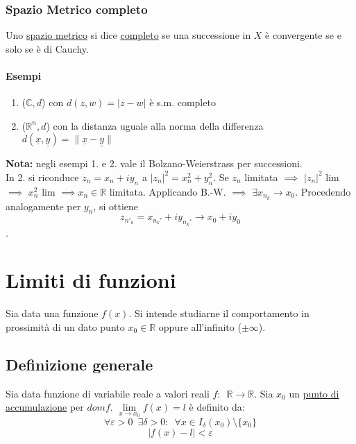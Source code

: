 \documentclass[10pt, oneside]{book}
\theoremstyle{plain}
\begin{document}
\subsection{Spazio Metrico completo}
\begin{defin}
Uno \hyperlink{metrico}{spazio metrico} si dice \underline{completo} se una successione in $X$ è convergente se e solo se è di Cauchy.
\end{defin}
\subsubsection{Esempi}
\begin{enumerate}
    \item ($\mathbb{C}, d$) con $d(z,w) = |z - w|$ è s.m. completo
    \item ($\mathbb{R}^n, d$) con la distanza uguale alla norma della differenza $d(\underline{x}, \underline{y}) = \lVert \underline{x} - \underline{y} \rVert$
\end{enumerate}
\textbf{Nota:} negli esempi 1. e 2. vale il Bolzano-Weierstrass per successioni.\\
In 2. si riconduce $z_n = x_n + i y_n$ a 
$|z_n|^2 = x_n^2 + y_n^2$. 
Se $z_n$ limitata $\implies$ $|z_n|^2$ lim 
$\implies$ $x_n^2$ lim $\implies x_n \in \mathbb{R}$ limitata.
Applicando B.-W. $\implies$ $\exists x_{n_k} \rightarrow x_0$.
Procedendo analogamente per $y_n$, si ottiene \[z_{n'_k} = x_{n_k'} + i y_{n_k'} \longrightarrow x_0 + i y_0\].

\chapter{Limiti di funzioni}
Sia data una funzione $f(x)$. Si intende studiarne il comportamento in prossimità di un dato punto $x_0 \in \mathbb{R}$ oppure all'infinito ($\pm \infty$).

\section{Definizione generale}
\begin{defin}
Sia data funzione di variabile reale a valori reali $f : \enspace \mathbb{R} \rightarrow \mathbb{R}$. Sia $x_0$ un \hyperlink{accumulaz}{punto di accumulazione} per $dom f$. $\lim \limits_{x \rightarrow x_0} f(x) = l$ è definito da:
\[\forall \varepsilon > 0 \enspace \exists \delta > 0 : \enspace \forall x \in I_{\delta}(x_0) \setminus \{x_0\}\]
\[|f(x) - l| < \varepsilon\]
\end{defin}
\end{document}
